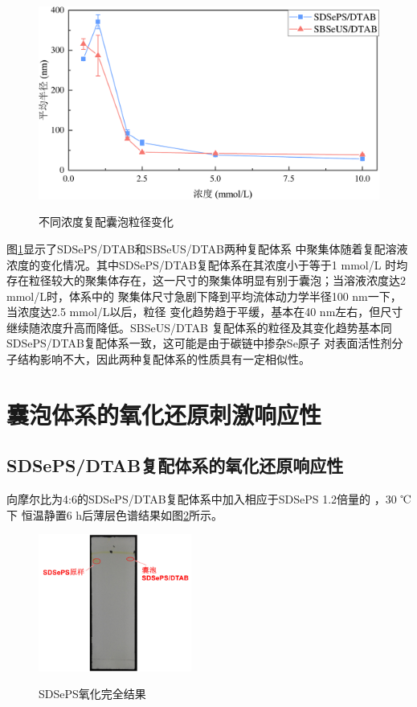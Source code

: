 \documentclass[bachelor,winfonts,replaceperiod]{jnuthesis}
\begin{document}
    \begin{figure}[htbp]
        \centering
        \includegraphics[width=.67\textwidth]{Figure/vesicle-concentration-line.pdf}\\
        \caption{不同浓度复配囊泡粒径变化}\label{fig:vesicle-concentration-line}
    \end{figure}
    
    图\ref{fig:vesicle-concentration-line}显示了SDSePS/DTAB和SBSeUS/DTAB两种复配体系
    中聚集体随着复配溶液浓度的变化情况。其中SDSePS/DTAB复配体系在其浓度小于等于1 mmol/L
    时均存在粒径较大的聚集体存在，这一尺寸的聚集体明显有别于囊泡；当溶液浓度达2 mmol/L时，体系中的
    聚集体尺寸急剧下降到平均流体动力学半径100 nm一下，当浓度达2.5 mmol/L以后，粒径
    变化趋势趋于平缓，基本在40 nm左右，但尺寸继续随浓度升高而降低。SBSeUS/DTAB
    复配体系的粒径及其变化趋势基本同SDSePS/DTAB复配体系一致，这可能是由于碳链中掺杂Se原子
    对表面活性剂分子结构影响不大，因此两种复配体系的性质具有一定相似性。
        
    \section{囊泡体系的氧化还原刺激响应性}
    \subsection{SDSePS/DTAB复配体系的氧化还原响应性}
    向摩尔比为4:6的SDSePS/DTAB复配体系中加入相应于SDSePS 1.2倍量的 ，30 ℃下
    恒温静置6 h后薄层色谱结果如图\ref{fig:SDSePS-Ox-tlc}所示。
    \begin{figure}[htbp]
        \centering
        \includegraphics[height=4.5cm]{figure/SDSePS-Ox-tlc.jpg}\\
        \caption{SDSePS氧化完全结果}\label{fig:SDSePS-Ox-tlc}
    \end{figure}
    
\end{document}
